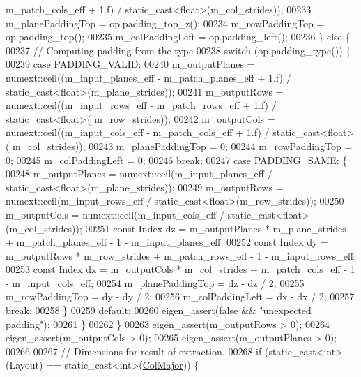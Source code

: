 \begin{DoxyCode}
      m\_patch\_cols\_eff + 1.f) / static\_cast<float>(m\_col\_strides));
00233       m\_planePaddingTop = op.padding\_top\_z();
00234       m\_rowPaddingTop = op.padding\_top();
00235       m\_colPaddingLeft = op.padding\_left();
00236     \} \textcolor{keywordflow}{else} \{
00237       \textcolor{comment}{// Computing padding from the type}
00238       \textcolor{keywordflow}{switch} (op.padding\_type()) \{
00239         \textcolor{keywordflow}{case} PADDING\_VALID:
00240           m\_outputPlanes = numext::ceil((m\_input\_planes\_eff - m\_patch\_planes\_eff + 1.f) / 
      static\_cast<float>(m\_plane\_strides));
00241           m\_outputRows = numext::ceil((m\_input\_rows\_eff - m\_patch\_rows\_eff + 1.f) / static\_cast<float>(
      m\_row\_strides));
00242           m\_outputCols = numext::ceil((m\_input\_cols\_eff - m\_patch\_cols\_eff + 1.f) / static\_cast<float>(
      m\_col\_strides));
00243           m\_planePaddingTop = 0;
00244           m\_rowPaddingTop = 0;
00245           m\_colPaddingLeft = 0;
00246           \textcolor{keywordflow}{break};
00247         \textcolor{keywordflow}{case} PADDING\_SAME: \{
00248           m\_outputPlanes = numext::ceil(m\_input\_planes\_eff / static\_cast<float>(m\_plane\_strides));
00249           m\_outputRows = numext::ceil(m\_input\_rows\_eff / static\_cast<float>(m\_row\_strides));
00250           m\_outputCols = numext::ceil(m\_input\_cols\_eff / static\_cast<float>(m\_col\_strides));
00251           \textcolor{keyword}{const} Index dz = m\_outputPlanes * m\_plane\_strides + m\_patch\_planes\_eff - 1 - m\_input\_planes\_eff;
00252           \textcolor{keyword}{const} Index dy = m\_outputRows * m\_row\_strides + m\_patch\_rows\_eff - 1 - m\_input\_rows\_eff;
00253           \textcolor{keyword}{const} Index dx = m\_outputCols * m\_col\_strides + m\_patch\_cols\_eff - 1 - m\_input\_cols\_eff;
00254           m\_planePaddingTop = dz - dz / 2;
00255           m\_rowPaddingTop = dy - dy / 2;
00256           m\_colPaddingLeft = dx - dx / 2;
00257           \textcolor{keywordflow}{break};
00258         \}
00259         \textcolor{keywordflow}{default}:
00260           eigen\_assert(\textcolor{keyword}{false} && \textcolor{stringliteral}{"unexpected padding"});
00261       \}
00262     \}
00263     eigen\_assert(m\_outputRows > 0);
00264     eigen\_assert(m\_outputCols > 0);
00265     eigen\_assert(m\_outputPlanes > 0);
00266 
00267     \textcolor{comment}{// Dimensions for result of extraction.}
00268     \textcolor{keywordflow}{if} (static\_cast<int>(Layout) == static\_cast<int>(\hyperlink{group__enums_ggaacded1a18ae58b0f554751f6cdf9eb13a0cbd4bdd0abcfc0224c5fcb5e4f6669a}{ColMajor})) \{

\end{DoxyCode}
